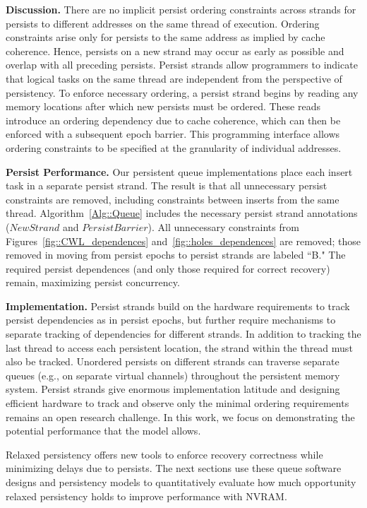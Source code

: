\textbf{Discussion.}
There are no implicit persist ordering constraints across strands for persists to different addresses on the same thread of execution.
Ordering constraints arise only for persists to the same address as implied by cache coherence.
Hence, persists on a new strand may occur as early as possible and overlap with all preceding persists.
Persist strands allow programmers to indicate that logical tasks on the same thread are independent from the perspective of persistency.
To enforce necessary ordering, a persist strand begins by reading any memory locations after which new persists must be ordered.
These reads introduce an ordering dependency due to cache coherence, which can then be enforced with a subsequent epoch barrier.
This programming interface allows ordering constraints to be specified at the granularity of individual addresses.

\textbf{Persist Performance.}
Our persistent queue implementations place each insert task in a separate persist strand.
The result is that all unnecessary persist constraints are removed, including constraints between inserts from the same thread.
Algorithm~\ref{Alg::Queue} includes the necessary persist strand annotations ($NewStrand$ and $PersistBarrier$).
All unnecessary constraints from Figures~\ref{fig::CWL_dependences} and~\ref{fig::holes_dependences} are removed; those removed in moving from persist epochs to persist strands are labeled ``B."
The required persist dependences (and only those required for correct recovery) remain, maximizing persist concurrency.

\textbf{Implementation.}
Persist strands build on the hardware requirements to track persist dependencies as in persist epochs, but further require mechanisms to separate tracking of dependencies for different strands.  In addition to tracking the last thread to access each persistent location, the strand within the thread must also be tracked.  Unordered persists on different strands can traverse separate queues (e.g., on separate virtual channels) throughout the persistent memory system.  Persist strands give enormous implementation latitude and designing efficient hardware to track and observe only the minimal ordering requirements remains an open research challenge.  In this work, we focus on demonstrating the potential performance that the model allows. 

Relaxed persistency offers new tools to enforce recovery correctness while minimizing delays due to persists.
The next sections use these queue software designs and persistency models to quantitatively evaluate how much opportunity relaxed persistency holds to improve performance with NVRAM.
